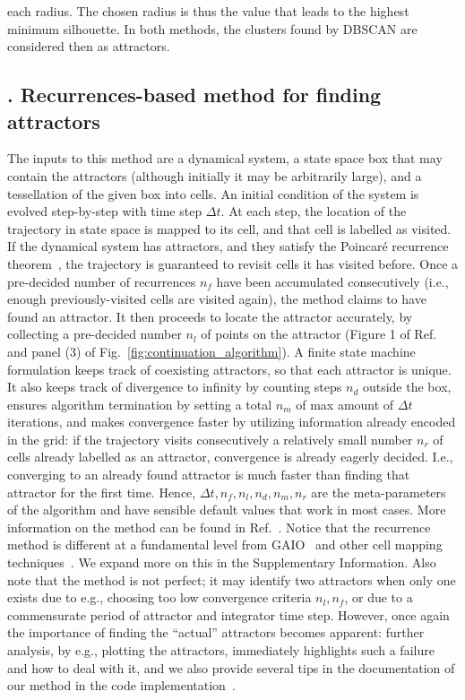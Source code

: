 \documentclass[9pt,twocolumn,twoside,lineno]{pnas-new}
\begin{document}
{each radius. The chosen radius is thus the value that leads to the highest minimum silhouette. In both methods, the clusters found by DBSCAN are considered then as attractors. 


\subsection*{. Recurrences-based method for finding attractors}
\label{mat:recurrences_summary}
The inputs to this method are a dynamical system, a state space box that may contain the attractors (although initially it may be arbitrarily large), and a tessellation of the given box into cells. An initial condition of the system is evolved step-by-step with time step $\Delta t$. At each step, the location of the trajectory in state space is mapped to its cell, and that cell is labelled as visited. If the dynamical system has attractors, and they satisfy the Poincar\'e recurrence theorem~\cite[Chap. 9]{DatserisBook}, the trajectory is guaranteed to revisit cells it has visited before. Once a pre-decided number of recurrences $n_f$ have been accumulated consecutively (i.e., enough previously-visited cells are visited again), the method claims to have found an attractor. It then proceeds to locate the attractor accurately, by collecting a pre-decided number $n_l$ of points on the attractor (Figure 1 of Ref.~\cite{DatserisWagemakers2022} and panel (3) of Fig.~\ref{fig:continuation_algorithm}). A finite state machine formulation keeps track of coexisting attractors, so that each attractor is unique. It also keeps track of divergence to infinity by counting steps $n_d$ outside the box, ensures algorithm termination by setting a total $n_m$ of max amount of $\Delta t$ iterations, and makes convergence faster by utilizing information already encoded in the grid: if the trajectory visits consecutively a relatively small number $n_r$ of cells already labelled as an attractor, convergence is already eagerly decided. I.e., converging to an already found attractor is much faster than finding that attractor for the first time. Hence, $\Delta t, n_f, n_l, n_d, n_m, n_r$ are the meta-parameters of the algorithm and have sensible default values that work in most cases. More information on the method can be found in Ref.~\cite{DatserisWagemakers2022}. Notice that the recurrence method is different at a fundamental level from GAIO~\cite{gerlach2020set} and other cell mapping techniques~\cite{sun2018cell}. We expand more on this in the Supplementary Information. Also note that the method is not perfect; it may identify two attractors when only one exists due to e.g., choosing too low convergence criteria $n_l, n_f$, or due to a commensurate period of attractor and integrator time step. However, once again the importance of finding the ``actual'' attractors becomes apparent: further analysis, by e.g., plotting the attractors, immediately highlights such a failure and how to deal with it, and we also provide several tips in the documentation of our method in the code implementation~\cite{Attractors.jl}.


}
\end{document}
